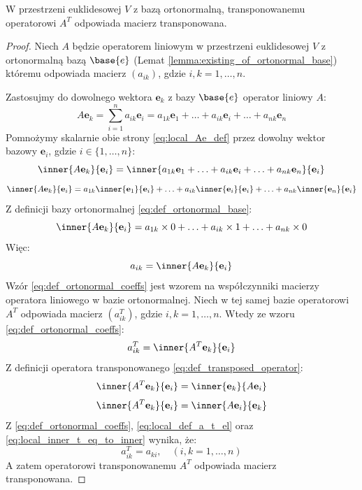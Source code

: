 \begin{theorem}
    W przestrzeni euklidesowej $V$ z bazą ortonormalną, transponowanemu operatorowi $A^T$ odpowiada macierz transponowana.
\end{theorem}
\begin{proof}
    Niech $A$ będzie operatorem liniowym w przestrzeni euklidesowej $V$ z  ortonormalną bazą $\base{e}$ (Lemat \ref{lemma:existing_of_ortonormal_base}) któremu odpowiada macierz $(a_{ik})$, gdzie $i, k = 1, \ldots, n$.

    Zastosujmy do dowolnego wektora $\mathbf{e}_k$ z bazy $\base{e}$ operator liniowy $A$:
    \begin{equation}\label{eq:local_Ae_def}
        A\mathbf{e}_k = \sum_{i=1}^{n}{a_{ik}\mathbf{e}_i} = a_{1k}\mathbf{e}_1 + \ldots + a_{ik}\mathbf{e}_i + \ldots + a_{nk}\mathbf{e}_n
    \end{equation}
    Pomnożymy skalarnie obie strony \eqref{eq:local_Ae_def} przez dowolny wektor bazowy $\mathbf{e}_i$, gdzie $i \in \{1, \ldots, n\}$:
    $$\inner{A\mathbf{e}_k}{\mathbf{e}_i} = \inner{
        a_{1k}\mathbf{e}_1 + \ldots + a_{ik}\mathbf{e}_i + \ldots + a_{nk}\mathbf{e}_n
    }{\mathbf{e}_i}$$
    $$\inner{A\mathbf{e}_k}{\mathbf{e}_i} = a_{1k}\inner{\mathbf{e}_1}{\mathbf{e}_i} + \ldots + a_{ik}\inner{\mathbf{e}_i}{\mathbf{e}_i} + \ldots + a_{nk}\inner{\mathbf{e}_n}{\mathbf{e}_i}$$
    Z definicji bazy ortonormalnej \eqref{eq:def_ortonormal_base}:
    $$\inner{A\mathbf{e}_k}{\mathbf{e}_i} = a_{1k} \times 0 + \ldots + a_{ik}\times 1 + \ldots + a_{nk} \times 0$$
    Więc:
    \begin{equation}\label{eq:def_ortonormal_coeffs}
        a_{ik} = \inner{A\mathbf{e}_k}{\mathbf{e}_i}
    \end{equation}
    Wzór \eqref{eq:def_ortonormal_coeffs} jest wzorem na współczynniki macierzy operatora liniowego w bazie ortonormalnej.
    Niech w tej samej bazie operatorowi $A^T$ odpowiada macierz $(a^T_{ik})$, gdzie $i, k = 1, \ldots, n$.
    Wtedy ze wzoru \eqref{eq:def_ortonormal_coeffs}:
    \begin{equation}\label{eq:local_def_a_t_el}
        a^T_{ik} = \inner{A^T\mathbf{e}_k}{\mathbf{e}_i}
    \end{equation}
    Z definicji operatora transponowanego \eqref{eq:def_transposed_operator}:
    $$\inner{A^T\mathbf{e}_k}{\mathbf{e}_i} = \inner{\mathbf{e}_k}{A\mathbf{e}_i}$$
    \begin{equation}\label{eq:local_inner_t_eq_to_inner}
        \inner{A^T\mathbf{e}_k}{\mathbf{e}_i} = \inner{A\mathbf{e}_i}{\mathbf{e}_k}
    \end{equation}
    Z \eqref{eq:def_ortonormal_coeffs}, \eqref{eq:local_def_a_t_el} oraz \eqref{eq:local_inner_t_eq_to_inner} wynika, że:
    $$a^T_{ik} = a_{ki}, \quad (i, k = 1, \ldots, n)$$
    A zatem operatorowi transponowanemu $A^T$ odpowiada macierz transponowana.
\end{proof}

